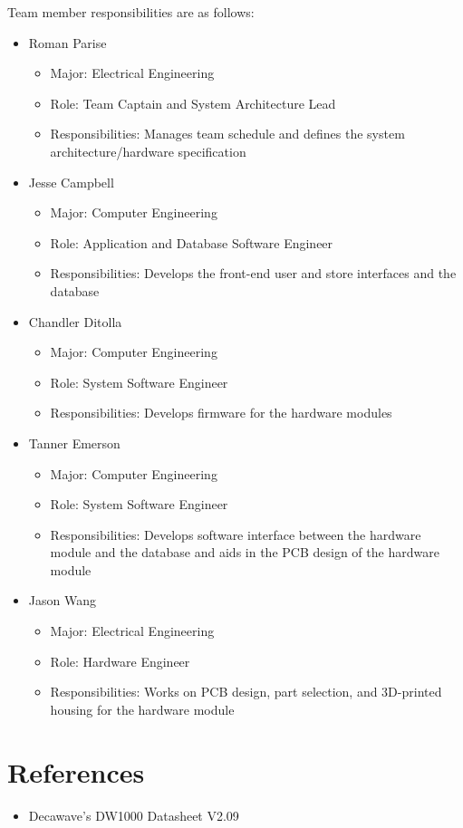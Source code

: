 \documentclass{article}
\begin{document}
Team member responsibilities are as follows: \\
\begin{itemize}
\item Roman Parise
	\begin{itemize}
	\item Major: Electrical Engineering
	\item Role: Team Captain and System Architecture Lead
	\item Responsibilities: Manages team schedule and defines the system architecture/hardware specification
	\end{itemize}
\item Jesse Campbell
	\begin{itemize}
	\item Major: Computer Engineering
	\item Role: Application and Database Software Engineer
	\item Responsibilities: Develops the front-end user and store interfaces and the database
	\end{itemize}
\item Chandler Ditolla
	\begin{itemize}
	\item Major: Computer Engineering
	\item Role: System Software Engineer
	\item Responsibilities: Develops firmware for the hardware modules
	\end{itemize}
\item Tanner Emerson
	\begin{itemize}
	\item Major: Computer Engineering
	\item Role: System Software Engineer
	\item Responsibilities: Develops software interface between the hardware module and the database and aids in the PCB design of the hardware module
	\end{itemize}
\item Jason Wang
	\begin{itemize}
	\item Major: Electrical Engineering
	\item Role: Hardware Engineer
	\item Responsibilities: Works on PCB design, part selection, and 3D-printed housing for the hardware module
	\end{itemize}
\end{itemize}

\section{References}
\begin{itemize}
\item Decawave's DW1000 Datasheet V2.09
\end{itemize}
\end{document}
